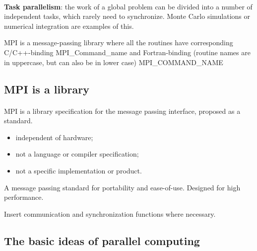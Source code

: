 \documentclass[%
twoside,                 %
final,                   %
10pt]{article}
\begin{document}
\paragraph{}
\textbf{Task parallelism}: the work of a global problem can be divided
into a number of independent tasks, which rarely need to synchronize. 
Monte Carlo simulations or numerical integration are examples of this.


MPI is a message-passing library where all the routines
have corresponding C/C++-binding
\bcppcod
   MPI_Command_name
\ecppcod
and Fortran-binding (routine names are in uppercase, but can also be in lower case)
\bforcod
   MPI_COMMAND_NAME
\eforcod




\subsection{MPI is a library}

\paragraph{}
MPI is a library specification for the message passing interface,
proposed as a standard.

\begin{itemize}
\item independent of hardware;

\item not a language or compiler specification;

\item not a specific implementation or product.
\end{itemize}

\noindent
A message passing standard for portability and ease-of-use. 
Designed for high performance.

Insert communication and synchronization functions where necessary.


\subsection{The basic ideas of parallel computing}

\paragraph{}
\end{document}
